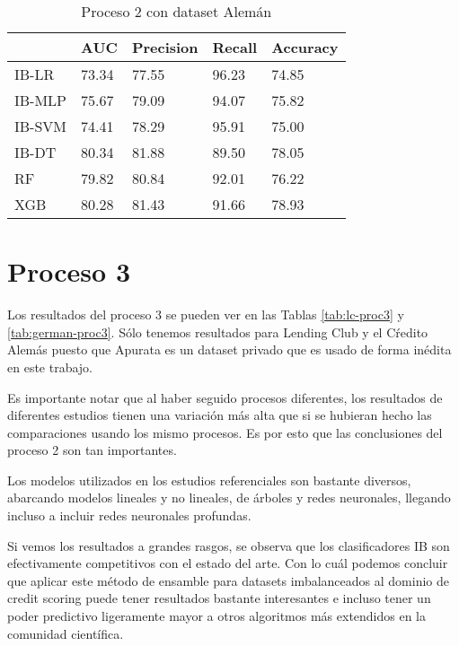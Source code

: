 \begin{table}[]
\centering
\caption{Proceso 2 con dataset Alemán}
\label{tab:german-proc2}
\begin{tabularx}{0.75\textwidth}{|l|Y Y Y Y|}
                \hline
                & AUC       & Precision & Recall    & Accuracy  \\
                \hline
IB-LR           & 73.34     & 77.55     & 96.23     & 74.85     \\
IB-MLP          & 75.67     & 79.09     & 94.07     & 75.82     \\
IB-SVM          & 74.41     & 78.29     & 95.91     & 75.00     \\
IB-DT           & 80.34     & 81.88     & 89.50     & 78.05     \\
                \hline
RF              & 79.82     & 80.84     & 92.01     & 76.22     \\
XGB             & 80.28     & 81.43     & 91.66     & 78.93     \\
                \hline
\end{tabularx}
\end{table}


\section{Proceso 3} %

Los resultados del proceso 3 se pueden ver en las Tablas \ref{tab:lc-proc3} y \ref{tab:german-proc3}. Sólo tenemos resultados para Lending Club y el Cŕedito Alemás puesto que Apurata es un dataset privado que es usado de forma inédita en este trabajo.

Es importante notar que al haber seguido procesos diferentes, los resultados de diferentes estudios tienen una variación más alta que si se hubieran hecho las comparaciones usando los mismo procesos. Es por esto que las conclusiones del proceso 2 son tan importantes.

Los modelos utilizados en los estudios referenciales son bastante diversos, abarcando modelos lineales y no lineales, de árboles y redes neuronales, llegando incluso a incluir redes neuronales profundas.

Si vemos los resultados a grandes rasgos, se observa que los clasificadores IB son efectivamente competitivos con el estado del arte. Con lo cuál podemos concluir que aplicar este método de ensamble para datasets imbalanceados al dominio de credit scoring puede tener resultados bastante interesantes e incluso tener un poder predictivo ligeramente mayor a otros algoritmos más extendidos en la comunidad científica. 


